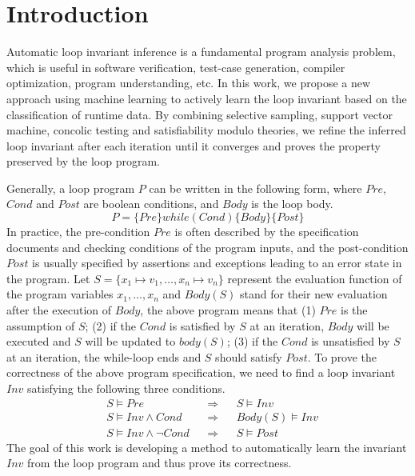 
\section{Introduction} %
\label{sec:introduction}

Automatic loop invariant inference is a fundamental program analysis problem, 
which is useful in software verification, test-case generation, 
compiler optimization, program understanding, etc. 
In this work, we propose a new approach using machine learning 
to actively learn the loop invariant based on the classification of runtime data. 
By combining selective sampling, support vector machine, 
concolic testing and satisfiability modulo theories, 
we refine the inferred loop invariant after each iteration 
until it converges and proves the property preserved by the loop program. 

Generally, a loop program $P$ can be written in the following form, 
where $\mathit{Pre}$, $\mathit{Cond}$ and $\mathit{Post}$ are boolean conditions, 
and $\mathit{Body}$ is the loop body. 
\[
    P = \{ \mathit{Pre} \} \mathit{while}(\mathit{Cond}) \{ \mathit{Body} \} \{ \mathit{Post} \}
\]
In practice, the pre-condition $\mathit{Pre}$ is often described by 
the specification documents and checking conditions of the program inputs, 
and the post-condition $\mathit{Post}$ is usually specified 
by assertions and exceptions leading to an error state in the program. 
Let $S = \{ x_1 \mapsto v_1, \ldots, x_n \mapsto v_n \}$ represent 
the evaluation function of the program variables $x_1, \ldots, x_n$
and $\mathit{Body}(S)$ stand for their new evaluation after the execution of $\mathit{Body}$, 
the above program means that (1) $\mathit{Pre}$ is the assumption of $S$; 
(2) if the $\mathit{Cond}$ is satisfied by $S$ at an iteration, 
$\mathit{Body}$ will be executed and $S$ will be updated to $\mathit{body}(S)$; 
(3) if the $\mathit{Cond}$ is unsatisfied by $S$ at an iteration, 
the while-loop ends and $S$ should satisfy $\mathit{Post}$. 
To prove the correctness of the above program specification, 
we need to find a loop invariant $\mathit{Inv}$ satisfying the following three conditions. 
\begin{align}
    &S \models \mathit{Pre} 
        &&\Rightarrow && S \models \mathit{Inv} \label{inv:pre} \\
    &S \models \mathit{Inv} \land \mathit{Cond} 
        &&\Rightarrow && \mathit{Body}(S) \models \mathit{Inv} \label{inv:loop} \\
    &S \models \mathit{Inv} \land \neg\mathit{Cond} 
        &&\Rightarrow && S \models \mathit{Post} \label{inv:post}
\end{align}
The goal of this work is developing a method to automatically learn 
the invariant $\mathit{Inv}$ from the loop program and thus prove its correctness. 

